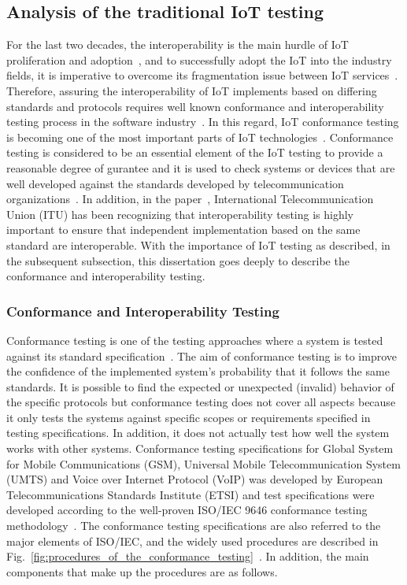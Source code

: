 \subsection{Analysis of the traditional IoT testing}
For the last two decades, the interoperability is the main hurdle of IoT proliferation and adoption~\cite{roman2013features, khan2012future, miorandi2012internet}, and to successfully adopt the IoT into the industry fields, it is imperative to overcome its fragmentation issue between IoT services~\cite{bandyopadhyay2011internet, song2014connecting}. Therefore, assuring the interoperability of IoT implements based on differing standards and protocols requires well known conformance and interoperability testing process in the software industry~\cite{vallejo2007state, seol2003fully, maag2008interoperability, hao2004integrated, schmidt2007ims}. In this regard, IoT conformance testing is becoming one of the most important parts of IoT technologies~\cite{ahmed2019aspects, sand2015iot}. Conformance testing is considered to be an essential element of the IoT testing to provide a reasonable degree of gurantee and it is used to check systems or devices that are well developed against the standards developed by telecommunication organizations~\cite{kone2000test, zhang2004ipv6, howden1980functional}. In addition, in the paper~\cite{kim2017towards}, International Telecommunication Union (ITU) has been recognizing that interoperability testing is highly important to ensure that independent implementation based on the same standard are interoperable. With the importance of IoT testing as described, in the subsequent subsection, this dissertation goes deeply to describe the conformance and interoperability testing.

\subsubsection{Conformance and Interoperability Testing}
Conformance testing is one of the testing approaches where a system is tested against its standard specification~\cite{rayner1987osi,krichen2009conformance,krichen2004black}. The aim of conformance testing is to improve the confidence of the implemented system's probability that it follows the same standards. It is possible to find the expected or unexpected (invalid) behavior of the specific protocols but conformance testing does not cover all aspects because it only tests the systems against specific scopes or requirements specified in testing specifications. In addition, it does not actually test how well the system works with other systems. Conformance testing specifications for Global System for Mobile Communications (GSM), Universal Mobile Telecommunication System (UMTS) and Voice over Internet Protocol (VoIP) was developed by European Telecommunications Standards Institute (ETSI) and test specifications were developed according to the well-proven ISO/IEC 9646 conformance testing methodology~\cite{moseley2003experience}. The conformance testing specifications are also referred to the major elements of ISO/IEC, and the widely used procedures are described in Fig.~\ref{fig:procedures_of_the_conformance_testing}~\cite{moseley2003experience}. In addition, the main components that make up the procedures are as follows.

